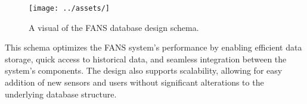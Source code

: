 
\begin{figure}[H]
    \centering
    \texttt{[image: ../assets/]}
    \caption{A visual of the FANS database design schema.}
\end{figure}

This schema optimizes the FANS system's performance by enabling efficient data storage, quick access to historical
data, and seamless integration between the system's components. The design also supports scalability, allowing for easy
addition of new sensors and users without significant alterations to the underlying database structure.
